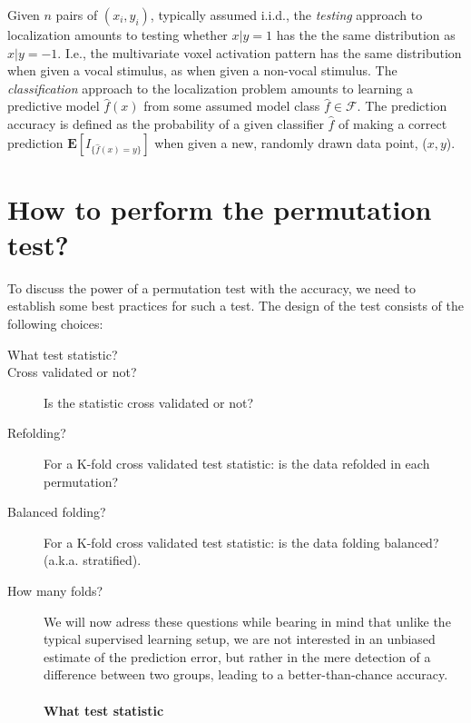 \documentclass{pnastwo}
\newcommand{\set}[1]{\{ #1 \}} %
\newcommand{\indicator}[1]{I_{\set{#1}}} %
\newcommand{\features}{x} %
\newcommand{\outcomes}{y} %
\newcommand{\hyp}{f} %
\newcommand{\hypclass}{\mathcal{F}}
\newcommand{\expect}[1]{\mathbf{E}\left[ #1 \right]} %
\begin{document}
\begin{article}
Given $n$ pairs of $(\features_i,\outcomes_i)$, typically assumed i.i.d., the \emph{testing} approach to localization amounts to testing whether $\features|\outcomes=1$ has the the same distribution as $\features|\outcomes=-1$.
I.e., the multivariate voxel activation pattern has the same distribution when given a vocal stimulus, as when given a non-vocal stimulus. 
The \emph{classification} approach to the localization problem amounts to learning a predictive model $\hat{\hyp}(\features)$ from some assumed model class $\hat{\hyp}\in \hypclass$. 
The prediction accuracy is defined as the probability of a given classifier $\hat{\hyp}$ of making a correct prediction $\expect{\indicator{\hat{\hyp}(x)=y}}$ when given a new, randomly drawn data point, ($\features,\outcomes$).





\section{How to perform the permutation test?}

To discuss the power of a permutation test with the accuracy, we need to establish some best practices for such a test. 
The design of the test consists of the following choices: 
\begin{description}
\item [What test statistic?] 
\item [Cross validated or not?] Is the statistic cross validated or not?
\item [Refolding?] For a K-fold cross validated test statistic: is the data refolded in each permutation? 
\item [Balanced folding?] For a K-fold cross validated test statistic: is the data folding balanced? (a.k.a. stratified).
\item [How many folds?] 

We will now adress these questions while bearing in mind that unlike the typical supervised learning setup, we are not interested in an unbiased estimate of the prediction error, but rather in the mere detection of a difference between two groups, leading to a better-than-chance accuracy. 

\paragraph{What test statistic}



\end{description}




\end{article}
\end{document}
